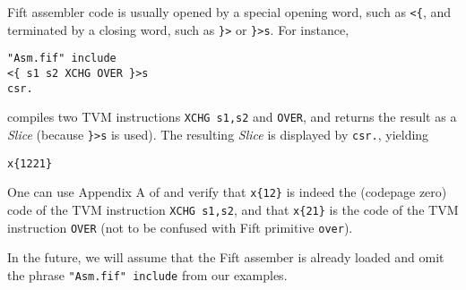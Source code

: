 \documentclass[12pt,oneside]{article}
\begin{document}
Fift assembler code is usually opened by a special opening word, such as {\tt <\{}, and terminated by a closing word, such as {\tt \}>} or {\tt \}>s}. For instance,
\begin{verbatim}
"Asm.fif" include
<{ s1 s2 XCHG OVER }>s
csr.
\end{verbatim}
compiles two TVM instructions {\tt XCHG s1,s2} and {\tt OVER}, and returns the result as a {\em Slice\/} (because {\tt \}>s} is used). The resulting {\em Slice\/} is displayed by {\tt csr.}, yielding
\begin{verbatim}
x{1221}
\end{verbatim}
One can use Appendix A of \cite{TVM} and verify that {\tt x\{12\}} is indeed the (codepage zero) code of the TVM instruction {\tt XCHG s1,s2}, and that {\tt x\{21\}} is the code of the TVM instruction {\tt OVER} (not to be confused with Fift primitive {\tt over}).

In the future, we will assume that the Fift assember is already loaded and omit the phrase {\tt "Asm.fif" include} from our examples.
\end{document}
